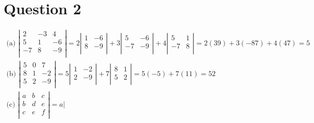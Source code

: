 \documentclass[12pt, a4paper]{article}
\begin{document}
\section{Question 2}
\begin{gather*}
  \text{(a) }
  \left| \begin{array}{ccc}
    2 & -3 & 4\\
    5 & 1 & -6\\
    -7 & 8 & -9\\
  \end{array} \right|
  = 2 
  \left| \begin{array}{cc}
    1 & -6\\
    8 & -9 \\
  \end{array} \right| 
  + 3
  \left| \begin{array}{cc}
    5 & -6\\
    -7 & -9 \\
  \end{array} \right| 
  + 4
  \left| \begin{array}{cc}
    5 & 1\\
    -7 & 8 \\
  \end{array} \right| 
  = 2(39) + 3(-87) + 4(47) = 5 \\[5pt]
  \text{(b) }
  \left| \begin{array}{ccc}
    5 & 0 & 7\\
    8 & 1 & -2\\
    5 & 2 & -9\\
  \end{array} \right|
   = 5 
  \left| \begin{array}{cc}
    1 & -2\\
    2 & -9 \\
  \end{array} \right| 
  + 7
  \left| \begin{array}{cc}
    8 & 1\\
    5 & 2 \\
  \end{array} \right| 
  = 5(-5) + 7(11) = 52 \\[5pt]
  \text{(c) }
  \left| \begin{array}{ccc}
    a & b & c\\
    b & d & e\\
    c & e & f\\
  \end{array} \right|
  = a 
  \left| \begin{array}{cc}

\end{array}
\end{gather*}
\end{document}
